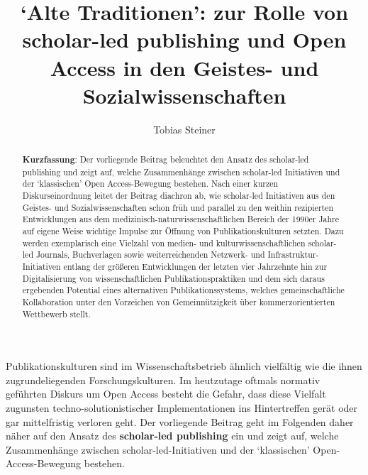 \documentclass[a4paper,
fontsize=11pt,
oneside,
numbers=noperiodatend,
parskip=half-,
bibliography=totoc,
final
]{scrartcl}
\title{\LARGE{\enquote*{Alte Traditionen}: zur Rolle von scholar-led publishing und Open Access in den Geistes- und Sozialwissenschaften}}%
\author{Tobias Steiner} %
\date{}
\begin{document}
\maketitle
\thispagestyle{fancyplain} 

\begin{abstract}
\noindent
\textbf{Kurzfassung}: Der vorliegende Beitrag beleuchtet den Ansatz des
scholar-led publishing und zeigt auf, welche Zusammenhänge zwischen
scholar-led Initiativen und der \enquote*{klassischen} Open Access-Bewegung
bestehen. Nach einer kurzen Diskurseinordnung leitet der Beitrag
diachron ab, wie scholar-led Initiativen aus den Geistes- und
Sozialwissenschaften schon früh und parallel zu den weithin rezipierten
Entwicklungen aus dem medizinisch-naturwissenschaftlichen Bereich der
1990er Jahre auf eigene Weise wichtige Impulse zur Öffnung von
Publikationskulturen setzten. Dazu werden exemplarisch eine Vielzahl von
medien- und kulturwissenschaftlichen scholar-led Journals, Buchverlagen
sowie weiterreichenden Netzwerk- und Infrastruktur-Initiativen entlang
der größeren Entwicklungen der letzten vier Jahrzehnte hin zur
Digitalisierung von wissenschaftlichen Publikationspraktiken und dem
sich daraus ergebenden Potential eines alternativen Publikationssystems,
welches gemeinschaftliche Kollaboration unter den Vorzeichen von
Gemeinnützigkeit über kommerzorientierten Wettbewerb stellt.
\end{abstract}

Publikationskulturen sind im Wissenschaftsbetrieb ähnlich vielfältig wie
die ihnen zugrundeliegenden Forschungskulturen. Im heutzutage oftmals
normativ geführten Diskurs um Open Access besteht die Gefahr, dass diese
Vielfalt zugunsten techno-solutionistischer Implementationen ins
Hintertreffen gerät oder gar mittelfristig verloren geht. Der
vorliegende Beitrag geht im Folgenden daher näher auf den Ansatz des
\textbf{scholar-led publishing} ein und zeigt auf, welche Zusammenhänge
zwischen scholar-led-Initiativen und der \enquote*{klassischen}
Open-Access-Bewegung bestehen.
\end{document}
